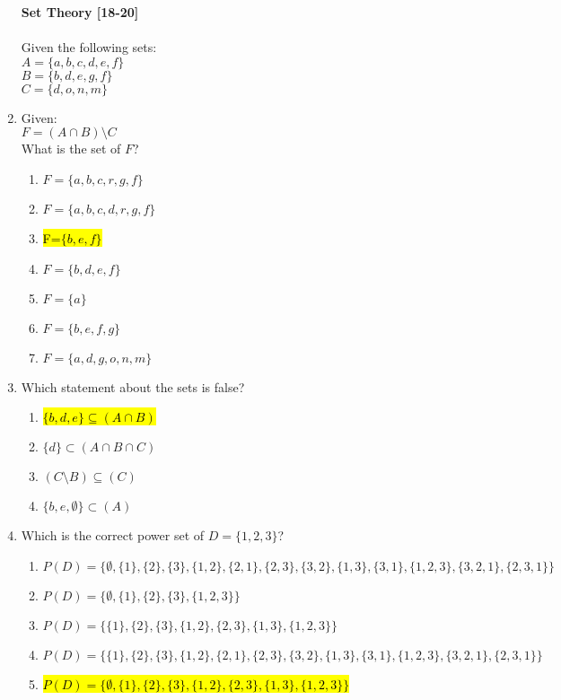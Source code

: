 \documentclass{article}
\begin{document}
\begin{enumerate}
\newpage

\textbf{Set Theory [18-20]}\\\\
Given the following sets:\\
$A=\{a,b,c,d,e,f\}$\\
$B=\{b,d,e,g,f\}$\\
$C=\{d,o,n,m\}$\\
\item Given:\\
$F=(A\cap B)\setminus C$\\
What is the set of $F$?
\begin{enumerate}
\item $F=\{a,b,c,r,g,f\}$
\item $F=\{a,b,c,d, r,g,f\}$
\item \hl{F=$\{b,e,f\}$}
\item $F=\{b,d,e,f\}$
\item $F=\{a\}$
\item $F=\{b,e,f,g\}$
\item $F=\{a,d,g,o,n,m\}$
\end{enumerate}

\item Which statement about the sets is false?
\begin{enumerate}
\item \hl{$\{b,d,e\}\subseteq (A\cap B)$}
\item $\{d\}\subset(A\cap B\cap C)$
\item $(C\setminus B)\subseteq(C)$
\item $\{b,e,\emptyset\}\subset(A)$
\end{enumerate}

\item Which is the correct power set of $D=\{1,2,3\}$?
\begin{enumerate}
\item $P(D)=\{\emptyset,\{1\},\{2\},\{3\},\{1,2\},\{2,1\},\{2,3\},\{3,2\},\{1,3\},\{3,1\},\{1,2,3\},\{3,2,1\},\{2,3,1\}\}$
\item $P(D)=\{\emptyset,\{1\},\{2\},\{3\},\{1,2,3\}\}$
\item $P(D)=\{\{1\},\{2\},\{3\},\{1,2\},\{2,3\},\{1,3\},\{1,2,3\}\}$
\item $P(D)=\{\{1\},\{2\},\{3\},\{1,2\},\{2,1\},\{2,3\},\{3,2\},\{1,3\},\{3,1\},\{1,2,3\},\{3,2,1\},\{2,3,1\}\}$
\item \hl{$P(D)=\{\emptyset,\{1\},\{2\},\{3\},\{1,2\},\{2,3\},\{1,3\},\{1,2,3\}\}$}
\end{enumerate}

\end{enumerate}
\end{document}
